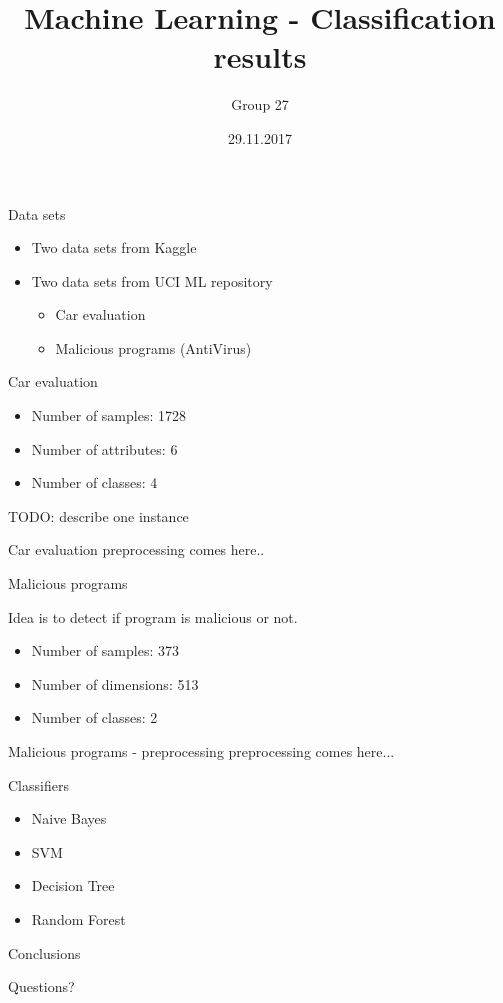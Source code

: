 \documentclass{beamer}
\title[Machine Learning]{Machine Learning - Classification results}
\author{Group 27}
\institute{TU Wien}
\date{29.11.2017}
\begin{document}
\begin{frame}
  \titlepage
\end{frame}


\begin{frame}{Data sets}

\begin{itemize}
  \item Two data sets from Kaggle
  \item Two data sets from UCI ML repository
  \begin{itemize}
  	\item Car evaluation
    \item Malicious programs (AntiVirus)
  \end{itemize}
\end{itemize}

\end{frame}

\begin{frame}{Car evaluation}
\begin{itemize}
	\item Number of samples: 1728
	\item Number of attributes: 6
	\item Number of classes: 4
\end{itemize}
TODO: describe one instance
\end{frame}
\begin{frame}{Car evaluation}
preprocessing comes here..
\end{frame}

\begin{frame}{Malicious programs}

Idea is to detect if program is malicious or not.

\begin{itemize}
	\item Number of samples: 373
	\item Number of dimensions: 513
	\item Number of classes: 2
\end{itemize}


\end{frame}
\begin{frame}{Malicious programs - preprocessing}
preprocessing comes here...
\end{frame}

\begin{frame}{Classifiers}
	\begin{itemize}
		\item Naive Bayes
		\pause
		\item SVM
		\pause
		\item Decision Tree
		\pause
		\item Random Forest
	\end{itemize}
\end{frame}

\begin{frame}{Conclusions}
\end{frame}

\begin{frame}{Questions?}
\end{frame}
\end{document}
